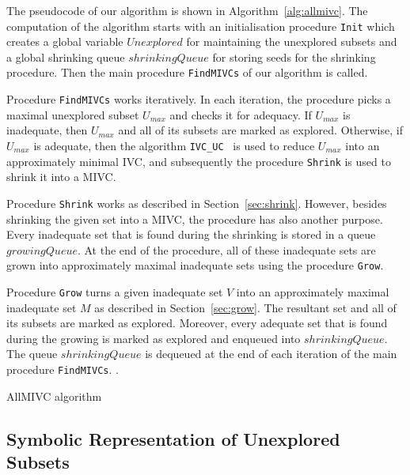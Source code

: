 The pseudocode of our algorithm is shown in Algorithm~\ref{alg:allmivc}. The computation of the algorithm starts with an initialisation procedure \texttt{Init} which creates a global variable $\mathit{Unexplored}$ for maintaining the unexplored subsets and a global shrinking queue $\mathit{shrinkingQueue}$ for storing seeds for the shrinking procedure. Then the main procedure \texttt{FindMIVCs} of our algorithm is called.

Procedure \texttt{FindMIVCs} works iteratively. In each iteration, the procedure picks a maximal unexplored subset $U_{max}$ and checks it for adequacy. If $U_{max}$ is inadequate, then $U_{max}$ and all of its subsets are marked as explored. Otherwise, if $U_{max}$ is adequate, then the algorithm \texttt{IVC\_UC}~\cite{Ghass16} is used to reduce $U_{max}$ into an approximately minimal IVC, and subsequently the procedure \texttt{Shrink} is used to shrink it into a MIVC.

Procedure \texttt{Shrink} works as described in Section~\ref{sec:shrink}. However, besides shrinking the given set into a MIVC, the procedure has also another purpose. Every inadequate set that is found during the shrinking is stored in a queue $\mathit{growingQueue}$. At the end of the procedure, all of these inadequate sets are grown into approximately maximal inadequate sets using the procedure \texttt{Grow}.

Procedure \texttt{Grow} turns a given inadequate set $V$ into an approximately maximal inadequate set $M$ as described in Section~\ref{sec:grow}. The resultant set and all of its subsets are marked as explored. Moreover, every adequate set that is found during the growing is marked as explored and enqueued into $\mathit{shrinkingQueue}$.
The queue $\mathit{shrinkingQueue}$ is dequeued at the end of each iteration of the main procedure \texttt{FindMIVCs}.  .




\begin{algorithm}[!t]

\caption{AllMIVC algorithm}
\label{alg:allmivc}
\end{algorithm}



\subsection{Symbolic Representation of Unexplored Subsets}
\label{sec:symbolic-representation}




